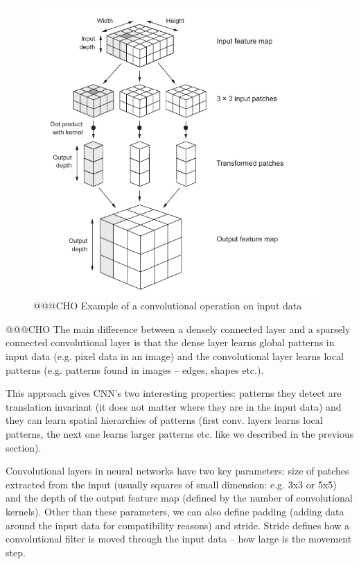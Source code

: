 \documentclass[b5paper]{book}
\begin{document}
\begin{figure}
    \centering
    \includegraphics[scale=0.5]{figures/conv-chollet.png}
    \caption{@@@CHO Example of a convolutional operation on input data}
    \label{fig:conv}
\end{figure}

@@@CHO
The main difference between a densely connected layer and a sparsely connected convolutional layer is that the dense layer learns global patterns in input data (e.g. pixel data in an image) and the convolutional layer learns local patterns (e.g. patterns found in images -- edges, shapes etc.).

This approach gives CNN's two interesting properties: patterns they detect are translation invariant (it does not matter where they are in the input data) and they can learn spatial hierarchies of patterns (first conv. layers learns local patterns, the next one learns larger patterns etc. like we described in the previous section).

Convolutional layers in neural networks have two key parameters: size of patches extracted from the input (usually squares of small dimension: e.g. 3x3 or 5x5) and the depth of the output feature map (defined by the number of convolutional kernels). Other than these parameters, we can also define padding (adding data around the input data for compatibility reasons) and stride. Stride defines how a convolutional filter is moved through the input data -- how large is the movement step. 
\end{document}
